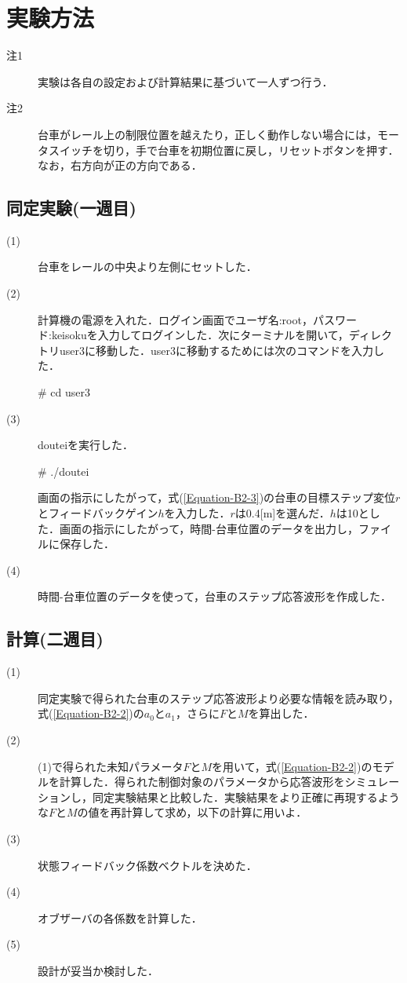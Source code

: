 \documentclass[12pt]{jsarticle}
\begin{document}
\section{実験方法}
\begin{description}
  \item[注1] 実験は各自の設定および計算結果に基づいて一人ずつ行う．
  \item[注2] 台車がレール上の制限位置を越えたり，正しく動作しない場合には，モータスイッチを切り，手で台車を初期位置に戻し，リセットボタンを押す．なお，右方向が正の方向である．
\end{description}
\subsection{同定実験(一週目)}
\begin{description}
  \item[(1)] 台車をレールの中央より左側にセットした．
　\item[(2)] 計算機の電源を入れた．ログイン画面でユーザ名:root，パスワード:keisokuを入力してログインした．次にターミナルを開いて，ディレクトリuser3に移動した．user3に移動するためには次のコマンドを入力した．
\begin{center}
  \# cd user3
\end{center}
  \item[(3)] douteiを実行した．
\begin{center}
  \# ./doutei
\end{center}
  画面の指示にしたがって，式(\ref{Equation-B2-3})の台車の目標ステップ変位$r$とフィードバックゲイン$h$を入力した．$r$は0.4[m]を選んだ．$h$は10とした．画面の指示にしたがって，時間-台車位置のデータを出力し，ファイルに保存した．
  \item[(4)] 時間-台車位置のデータを使って，台車のステップ応答波形を作成した．
\end{description}
\subsection{計算(二週目)}
\begin{description}
  \item[(1)] 同定実験で得られた台車のステップ応答波形より必要な情報を読み取り，式(\ref{Equation-B2-2})の$a_0$と$a_1$，さらに$F$と$M$を算出した．
  \item[(2)] (1)で得られた未知パラメータ$F$と$M$を用いて，式(\ref{Equation-B2-2})のモデルを計算した．得られた制御対象のパラメータから応答波形をシミュレーションし，同定実験結果と比較した．実験結果をより正確に再現するような$F$と$M$の値を再計算して求め，以下の計算に用いよ．
  \item[(3)] 状態フィードバック係数ベクトルを決めた．
  \item[(4)] オブザーバの各係数を計算した．
  \item[(5)] 設計が妥当か検討した．
\end{description}
\end{document}
